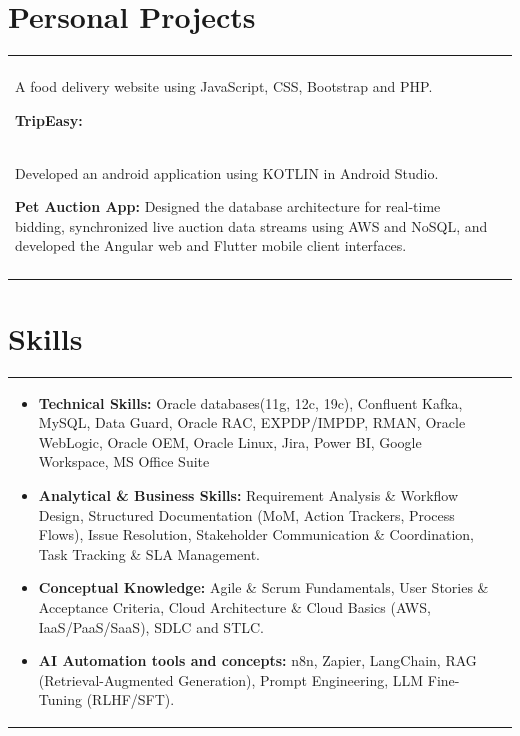 \documentclass[a4paper,8pt]{article}
\begin{document}
\section{Personal Projects}
\begin{tabularx}{\linewidth}{ @{}l r@{} }
\begin{minipage}[t]{\linewidth}
\begin{itemize}[nosep,after=\strut, leftmargin=2em, itemsep=4pt]

\item \textbf{NomNom:} \\
A food delivery website using JavaScript, CSS, Bootstrap and PHP. 
\item \textbf{TripEasy:} \\
Developed an android application using KOTLIN in Android Studio.
\item \textbf{Pet Auction App:} Designed the database architecture for real-time bidding, synchronized live auction data streams using AWS and NoSQL, and developed the Angular web and Flutter mobile client interfaces. \\


\end{itemize}
\end{minipage}
\end{tabularx}

\section{Skills}
\begin{tabularx}{\linewidth}{ @{}l r@{} }
\begin{minipage}[t]{\linewidth}
\begin{itemize}[nosep,after=\strut, leftmargin=2em, itemsep=4pt]

\item \textbf{Technical Skills:} Oracle databases(11g, 12c, 19c), Confluent Kafka, MySQL, Data Guard, Oracle RAC, EXPDP/IMPDP, RMAN, Oracle WebLogic, Oracle OEM, Oracle Linux, Jira, Power BI, Google Workspace, MS Office Suite
\item \textbf{Analytical \& Business Skills:} Requirement Analysis \& Workflow Design, Structured Documentation (MoM, Action Trackers, Process Flows), Issue Resolution, Stakeholder Communication \& Coordination, Task Tracking \& SLA Management.
\item \textbf{Conceptual Knowledge:} Agile \& Scrum Fundamentals, User Stories \& Acceptance Criteria, Cloud Architecture \& Cloud Basics (AWS, IaaS/PaaS/SaaS), SDLC and STLC. 
\item \textbf{AI Automation tools and concepts:} n8n, Zapier, LangChain, RAG (Retrieval-Augmented Generation), Prompt Engineering, LLM Fine-Tuning (RLHF/SFT).

\end{itemize}
\end{minipage}
\end{tabularx}
\end{document}
